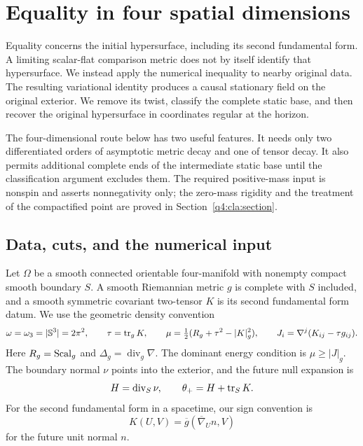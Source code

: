 \section{Equality in four spatial dimensions}
\label{q4:sec:setup}

Equality concerns the initial hypersurface, including its second fundamental
form. A limiting scalar-flat comparison metric does not by itself identify
that hypersurface. We instead apply the numerical inequality to nearby
original data. The resulting variational identity produces a causal
stationary field on the original exterior. We remove its twist, classify
the complete static base, and then recover the original hypersurface in
coordinates regular at the horizon.

The four-dimensional route below has two useful features. It needs only
two differentiated orders of asymptotic metric decay and one of tensor
decay. It also permits additional complete ends of the intermediate static
base until the classification argument excludes them. The required
positive-mass input is nonspin and asserts nonnegativity only; the
zero-mass rigidity and the treatment of the compactified point are proved
in Section~\ref{q4:cla:section}.

\subsection{Data, cuts, and the numerical input}

Let $\Omega$ be a smooth connected orientable four-manifold with nonempty
compact smooth boundary $S$. A smooth Riemannian metric $g$ is complete
with $S$ included, and a smooth symmetric covariant two-tensor $K$ is its
second fundamental form datum. We use the geometric density convention
\[
 \omega=\omega_3=|\mathbb S^3|=2\pi^2,\qquad
 \tau=\operatorname{tr}_gK,\qquad
 \mu=\tfrac12(R_g+\tau^2-|K|_g^2),\qquad
 J_i=\nabla^j(K_{ij}-\tau g_{ij}).
\]
Here $R_g=\operatorname{Scal}_g$ and $\Delta_g=\operatorname{div}_g\nabla$. The dominant energy
condition is $\mu\ge |J|_g$. The boundary normal $\nu$ points into the
exterior, and the future null expansion is
\[
 H=\operatorname{div}_S\nu,\qquad
 \theta_+=H+\operatorname{tr}_SK.
\]
For the second fundamental form in a spacetime, our sign convention is
\begin{equation}\label{q4:eq:intro-second-fundamental-form}
 K(U,V)=\overline g(\overline\nabla_U n,V)
\end{equation}
for the future unit normal $n$.

